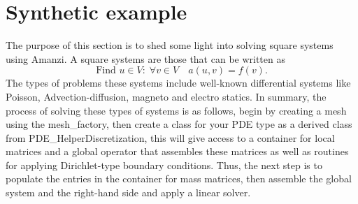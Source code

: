 \section{Synthetic example}
The purpose of this section is to shed some light into solving square systems using Amanzi. A square systems are those that can be written as
%
\begin{equation}
\mbox{Find }u\in V:\;\forall v\in V\quad
a(u,v) = f(v).
\end{equation}
%
The types of problems these systems include well-known differential systems like Poisson, Advection-diffusion, magneto and electro statics. In summary, the process of solving these types of systems is as follows, begin by creating a mesh using the mesh\_factory, then create a class for your PDE type as a derived class from PDE\_HelperDiscretization, this will give access to a container for local matrices and a global operator that assembles these matrices as well as routines for applying Dirichlet-type boundary conditions. Thus, the next step is to populate the entries in the container for mass matrices, then assemble the global system and the right-hand side and apply a linear solver.\\
%
